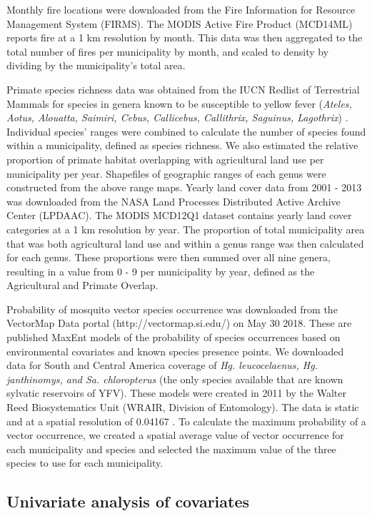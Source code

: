 \documentclass{article}
\begin{document}
Monthly fire locations were downloaded from the Fire Information for Resource Management System (FIRMS). The MODIS Active Fire Product (MCD14ML) reports fire at a 1 km resolution by month. This data was then aggregated to the total number of fires per municipality by month, and scaled to density by dividing by the municipality's total area.

Primate species richness data was obtained from the IUCN Redlist of Terrestrial Mammals for species in genera known to be susceptible to yellow fever (\textit{Ateles, Aotus, Alouatta, Saimiri, Cebus, Callicebus, Callithrix, Saguinus, Lagothrix}) \cite{bicca-marques2010,hamrick2017}. Individual species' ranges were combined to calculate the number of species found within a municipality, defined as species richness. We also estimated the relative proportion of primate habitat overlapping with agricultural land use per municipality per year. Shapefiles of geographic ranges of each genus were constructed from the above range maps. Yearly land cover data from 2001 - 2013 was downloaded from the NASA Land Processes Distributed Active Archive Center (LPDAAC). The MODIS MCD12Q1 dataset contains yearly land cover categories at a 1 km resolution by year. The proportion of total municipality area that was both agricultural land use and within a genus range was then calculated for each genus.  These proportions were then summed over all nine genera, resulting in a value from 0 - 9 per municipality by year, defined as the Agricultural and Primate Overlap.

Probability of mosquito vector species occurrence was downloaded from the VectorMap Data portal (http://vectormap.si.edu/) on May 30 2018. These are published MaxEnt models of the probability of species occurrences based on environmental covariates and known species presence points. We downloaded data for South and Central America coverage of \textit{Hg. leucocelaenus, Hg. janthinomys, and Sa. chloropterus} (the only species available that are known sylvatic reservoirs of YFV). These models were
created in 2011 by the Walter Reed Biosystematics Unit (WRAIR, Division of Entomology). The data is static and at a spatial resolution of 0.04167 \degree. To calculate the maximum probability of a vector occurrence, we created a spatial average value of vector occurrence for each municipality and species and selected the maximum value of the three species to use for each municipality.

\subsection{Univariate analysis of covariates}
\end{document}
